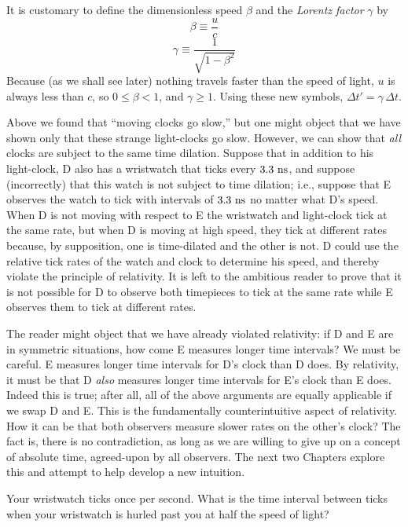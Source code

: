It is customary to define the dimensionless speed $\beta$ and the {\em
Lorentz factor\/} $\gamma$ by
\begin{equation}
\beta\equiv\frac{u}{c}
\end{equation}
\begin{equation}
\gamma\equiv\frac{1}{\sqrt{1-\beta^2}}
\end{equation}
Because (as we shall see later) nothing travels faster than the speed
of light, $u$ is always less than $c$, so $0\leq\beta <1$, and
$\gamma\geq 1$.  Using these new symbols, $\Delta t'=\gamma\,\Delta
t$.

Above we found that ``moving clocks go slow,'' but one might object
that we have shown only that these strange light-clocks go slow.
However, we can show that {\em all\/} clocks are subject to the same
time dilation.  Suppose that in addition to his light-clock, D also
has a wristwatch that ticks every $3.3~{\rm ns}$, and suppose
(incorrectly) that this watch is not subject to time dilation; i.e.,
suppose that E observes the watch to tick with intervals of $3.3~{\rm
ns}$ no matter what D's speed.  When D is not moving with respect to E
the wristwatch and light-clock tick at the same rate, but when D is
moving at high speed, they tick at different rates because, by
supposition, one is time-dilated and the other is not.  D could use
the relative tick rates of the watch and clock to determine his speed,
and thereby violate the principle of relativity.  It is left to the
ambitious reader to prove that it is not possible for D to observe
both timepieces to tick at the same rate while E observes them to tick
at different rates.

The reader might object that we have already violated relativity: if D
and E are in symmetric situations, how come E measures longer time
intervals?  We must be careful.  E measures longer time intervals for
D's clock than D does.  By relativity, it must be that D {\em also\/}
measures longer time intervals for E's clock than E does.  Indeed this
is true; after all, all of the above arguments are equally applicable
if we swap D and E.  This is the fundamentally counterintuitive aspect
of relativity.  How it can be that both observers measure slower rates
on the other's clock?  The fact is, there is no contradiction, as long
as we are willing to give up on a concept of absolute time,
agreed-upon by all observers.  The next two Chapters explore this and
attempt to help develop a new intuition.

\begin{problem}
Your wristwatch ticks once per second.  What is the time interval
between ticks when your wristwatch is hurled past you at half the
speed of light?
\end{problem}

